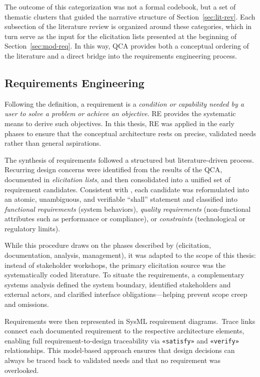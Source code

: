 The outcome of this categorization was not a formal codebook, but a set of thematic clusters that guided the narrative structure of Section~\ref{sec:lit-rev}. Each subsection of the literature review is organized around these categories, which in turn serve as the input for the elicitation lists presented at the beginning of Section~\ref{sec:mod-req}. In this way, QCA provides both a conceptual ordering of the literature and a direct bridge into the requirements engineering process.

\subsection{Requirements Engineering}\label{subsec:re-sa} %
Following the \textcite{IEEEStandard1990} definition, a requirement is a \emph{condition or capability needed by a user to solve a problem or achieve an objective}. RE provides the systematic means to derive such objectives. In this thesis, RE was applied in the early phases to ensure that the conceptual architecture rests on precise, validated needs rather than general aspirations.

The synthesis of requirements followed a structured but literature-driven process. Recurring design concerns were identified from the results of the QCA, documented in \emph{elicitation lists}, and then consolidated into a unified set of requirement candidates. Consistent with \textcite{glinzHandbook2020}, each candidate was reformulated into an atomic, unambiguous, and verifiable “shall” statement and classified into \emph{functional requirements} (system behaviors), \emph{quality requirements} (non-functional attributes such as performance or compliance), or \emph{constraints} (technological or regulatory limits).

While this procedure draws on the phases described by \textcite{herrmannGrundlagen2022} (elicitation, documentation, analysis, management), it was adapted to the scope of this thesis: instead of stakeholder workshops, the primary elicitation source was the systematically coded literature. To situate the requirements, a complementary systems analysis defined the system boundary, identified stakeholders and external actors, and clarified interface obligations---helping prevent scope creep and omissions.

Requirements were then represented in SysML requirement diagrams.~Trace links connect each documented requirement to the respective architecture elements, enabling full requirement-to-design traceability via \texttt{«satisfy»} and \texttt{«verify»} relationships. This model-based approach ensures that design decisions can always be traced back to validated needs and that no requirement was overlooked.

